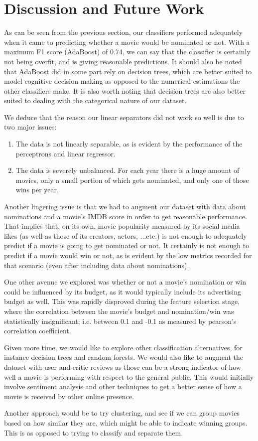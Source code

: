 \documentclass[journal,transmag]{IEEEtran}
\begin{document}
	\section{Discussion and Future Work}
		As can be seen from the previous section, our classifiers performed adequately when it came to predicting whether a movie would be nominated or not. With a maximum F1 score (AdaBoost) of 0.74, we can say that the classifier is certainly not being overfit, and is giving reasonable predictions. It should also be noted that AdaBoost did in some part rely on decision trees, which are better suited to model cognitive decision making as opposed to the numerical estimations the other classifiers make. It is also worth noting that decision trees are also better suited to dealing with the categorical nature of our dataset.
		\par
		We deduce that the reason our linear separators did not work so well is due to two major issues:
		\begin{enumerate}
			\item The data is not linearly separable, as is evident by the performance of the perceptrons and linear regressor.
			\item The data is severely unbalanced. For each year there is a huge amount of movies, only a small portion of which gets nominated, and only one of those wins per year.
		\end{enumerate}
		Another lingering issue is that we had to augment our dataset with data about nominations and a movie's IMDB score in order to get reasonable performance. That implies that, on its own, movie popularity measured by its social media likes (as well as those of its creators, actors, ...etc.) is not enough to adequately predict if a movie is going to get nominated or not. It certainly is not enough to predict if a movie would win or not, as is evident by the low metrics recorded for that scenario (even after including data about nominations).
		\par
		One other avenue we explored was whether or not a movie's nomination or win could be influenced by its budget, as it would typically include its advertising budget as well. This was rapidly disproved during the feature selection stage, where the correlation between the movie's budget and nomination/win was statistically insignificant; i.e. between 0.1 and -0.1 as measured by pearson's correlation coefficient.
		\par
		Given more time, we would like to explore other classification alternatives, for instance decision trees and random forests. We would also like to augment the dataset with user and critic reviews as those can be a strong indicator of how well a movie is performing with respect to the general public. This would initially involve sentiment analysis and other techniques to get a better sense of how a movie is received by other online presence.
		\par
		Another approach would be to try clustering, and see if we can group movies based on how similar they are, which might be able to indicate winning groups. This is as opposed to trying to classify  and separate them.
	
\end{document}

